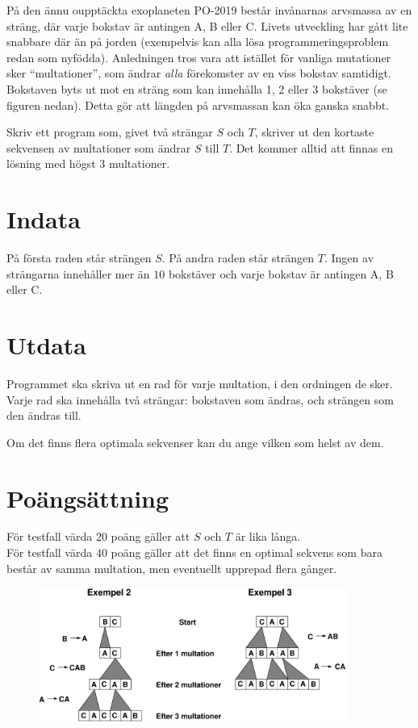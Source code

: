 På den ännu oupptäckta exoplaneten PO-2019 består invånarnas arvsmassa av en sträng, där varje bokstav är antingen A, B eller C. Livets utveckling har gått lite snabbare där än på  jorden (exempelvis kan alla lösa programmeringsproblem redan som nyfödda). Anledningen tros vara att istället för vanliga mutationer sker ``multationer'', som ändrar {\em alla} förekomster av en viss bokstav samtidigt. Bokstaven byts ut mot en sträng som kan innehålla 1, 2 eller 3 bokstäver (se figuren nedan). Detta gör att längden på arvsmassan kan öka ganska snabbt.

Skriv ett program som, givet två strängar $S$ och $T$, skriver ut den kortaste sekvensen av multationer som ändrar $S$ till $T$. Det kommer alltid att finnas en lösning med högst $3$ multationer.

\section*{Indata}
På första raden står strängen $S$. På andra raden står strängen $T$. Ingen av strängarna innehåller mer än $10$ bokstäver och varje bokstav är antingen A, B eller C.

\section*{Utdata}
Programmet ska skriva ut en rad för varje multation, i den ordningen de sker. Varje rad ska innehålla två strängar: bokstaven som ändras, och strängen som den ändras till.

Om det finns flera optimala sekvenser kan du ange vilken som helst av dem.

\section*{Poängsättning}
För testfall värda $20$ poäng gäller att $S$ och $T$ är lika långa. \\
För testfall värda $40$ poäng gäller att det finns en optimal sekvens som bara består av samma multation, men eventuellt upprepad flera gånger.

\begin{figure}[!h]
  \centering
      \includegraphics[width=0.9\textwidth]{multationer1.pdf}
\end{figure}
